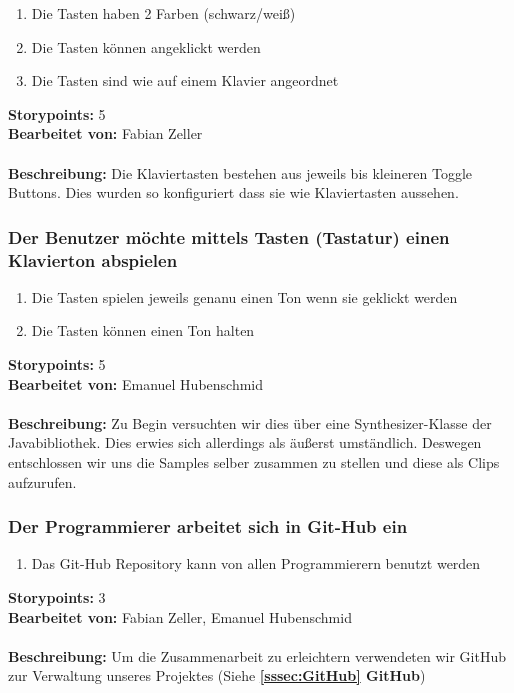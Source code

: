 \begin{enumerate}
 \item Die Tasten haben 2 Farben (schwarz/weiß)
 \item Die Tasten können angeklickt werden
 \item Die Tasten sind wie auf einem Klavier angeordnet
\end{enumerate}

\textbf{Storypoints:} 5 \\
\textbf{Bearbeitet von:} Fabian Zeller \\
\\
\textbf{Beschreibung:} Die Klaviertasten bestehen aus jeweils      bis    kleineren Toggle Buttons. Dies wurden so konfiguriert dass sie wie Klaviertasten aussehen. 


\subsubsection{Der Benutzer möchte mittels Tasten (Tastatur) einen Klavierton abspielen}

\begin{enumerate}
 \item Die Tasten spielen jeweils genanu einen Ton wenn sie geklickt werden
 \item Die Tasten können einen Ton halten
\end{enumerate}

\textbf{Storypoints:} 5 \\
\textbf{Bearbeitet von:} Emanuel Hubenschmid \\
\\
\textbf{Beschreibung:} Zu Begin versuchten wir dies über eine Synthesizer-Klasse der 
Javabibliothek. Dies erwies sich allerdings als äußerst umständlich. Deswegen entschlossen wir uns 
die Samples selber zusammen zu stellen und diese als Clips aufzurufen.


\subsubsection{Der Programmierer arbeitet sich in Git-Hub ein}

\begin{enumerate}
 \item Das Git-Hub Repository kann von allen Programmierern benutzt werden
\end{enumerate}

\textbf{Storypoints:} 3 \\
\textbf{Bearbeitet von:} Fabian Zeller, Emanuel Hubenschmid \\
\\
\textbf{Beschreibung:} Um die Zusammenarbeit zu erleichtern verwendeten wir GitHub zur Verwaltung 
unseres Projektes (Siehe \textbf{\ref{sssec:GitHub} GitHub})


